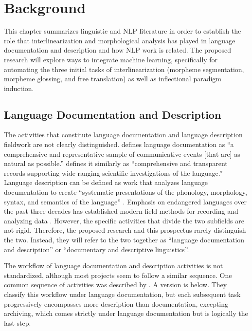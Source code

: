 \chapter{Background}
\label{chap:litreview}

This chapter summarizes linguistic and NLP literature in order to establish the role that interlinearization and morphological analysis has played in language documentation and description and how NLP work is related. The proposed research will explore ways to integrate machine learning, specifically for automating the three initial tasks of interlinearization (morpheme segmentation, morpheme glossing, and free translation) as well as inflectional paradigm induction. 

\section{Language Documentation and Description}
\label{sec:LDD}

The activities that constitute language documentation and language description fieldwork are not clearly distinguished. \cite{himmelmann_documentary_1998} defines language documentation as ``a comprehensive and representative sample of communicative events [that are] as natural as possible.” \cite{woodbury_defining_2003} defines it similarly as “comprehensive and transparent records supporting wide ranging scientific investigations of the language.” Language description can be defined as work that analyzes language documentation to create “systematic presentations of the phonology, morphology, syntax, and semantics of the language” \citep{bird_machine_2012}. Emphasis on endangered languages over the past three decades has established modern field methods for recording and analyzing data \citep{bowern_linguistic_2008,czaykowska-higgins_research_2009,lupke_data_2010,vallejos_integrating_2014,rice_community-based_2017}. However, the specific activities that divide the two subfields are not rigid. Therefore, the proposed research and this prospectus rarely distinguish the two. Instead, they will refer to the two together as “language documentation and description” or “documentary and descriptive linguistics”.

The workflow of language documentation and description activities is not standardized, although most projects seem to follow a similar sequence.  One common sequence of activities was described by \citet{bird_machine_2012}. A version is below. They classify this workflow under language documentation, but each subsequent task progressively encompasses more description than documentation, excepting archiving, which comes strictly under language documentation but is logically the last step.


